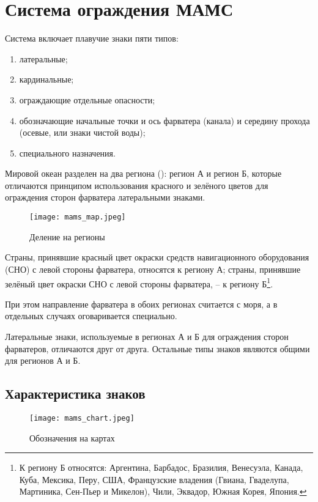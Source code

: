 \twocolumn

\chapter{Система ограждения МАМС}\label{app:mams}

Система включает плавучие знаки пяти типов:
\begin{enumerate}
\item латеральные;
\item кардинальные;
\item ограждающие отдельные опасности;
\item обозначающие начальные точки и ось фарватера (канала) и середину прохода (осевые, или знаки чистой воды);
\item специального назначения.
\end{enumerate}

Мировой океан разделен на два региона (): регион А и регион Б, которые
отличаются принципом использования красного и зелёного цветов для
ограждения сторон фарватера латеральными знаками.

\begin{figure*}[!htb]
  \centering{}
  \texttt{[image: mams\_map.jpeg]}
  \caption{Деление на регионы}
  \label{fig:mams-map}
\end{figure*}

Страны, принявшие красный цвет окраски средств навигационного
оборудования (СНО) с левой стороны фарватера, относятся к региону А;
страны, принявшие зелёный цвет окраски СНО с левой стороны фарватера,
\--- к региону Б\footnote{К региону Б относятся: Аргентина, Барбадос,
  Бразилия, Венесуэла, Канада, Куба, Мексика, Перу, США, Французские
  владения (Гвиана, Гваделупа, Мартиника, Сен-Пьер и Микелон), Чили,
  Эквадор, Южная Корея, Япония.}.

При этом направление фарватера в обоих регионах считается с моря, а в
отдельных случаях оговаривается специально.

Латеральные знаки, используемые в регионах А и Б для ограждения сторон
фарватеров, отличаются друг от друга. Остальные типы знаков являются
общими для регионов А и Б.

\section{Характеристика знаков}

\begin{figure*}[!htb]
  \centering{}
  \texttt{[image: mams\_chart.jpeg]}
  \caption{Обозначения на картах}
  \label{fig:mams-chart}
\end{figure*}

